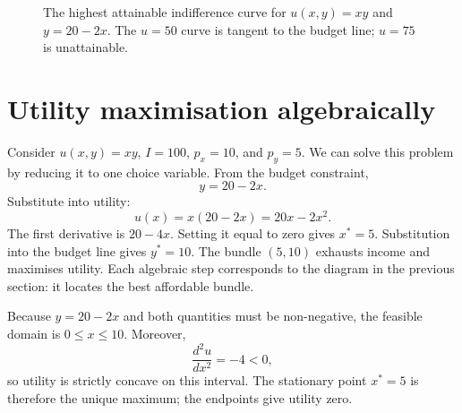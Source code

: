 \begin{figure}[!ht]
\centering
{}
\caption{The highest attainable indifference curve for
$u(x,y)=xy$ and $y=20-2x$. The $u=50$ curve is tangent to the budget line;
$u=75$ is unattainable.}
\label{fig:consumer-optimum}
\end{figure}

\section{Utility maximisation algebraically}

Consider $u(x,y)=xy$, $I=100$, $p_x=10$, and $p_y=5$. We can solve this
problem by reducing it to one choice variable. From the budget constraint,
\[
y=20-2x.
\]
Substitute into utility:
\[
u(x)=x(20-2x)=20x-2x^2.
\]
The first derivative is $20-4x$. Setting it equal to zero gives $x^*=5$.
Substitution into the budget line gives $y^*=10$. The bundle $(5,10)$
exhausts income and maximises utility. Each algebraic step corresponds to the
diagram in the previous section: it locates the best affordable bundle.

Because $y=20-2x$ and both quantities must be non-negative, the feasible
domain is $0\leq x\leq10$. Moreover,
\[
\frac{d^2u}{dx^2}=-4<0,
\]
so utility is strictly concave on this interval. The stationary point $x^*=5$
is therefore the unique maximum; the endpoints give utility zero.

